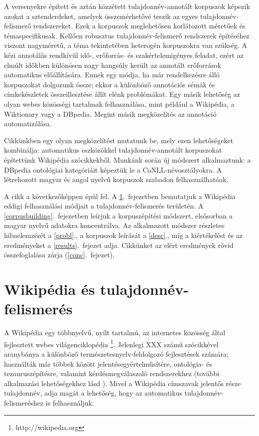 \documentclass{llncs}
\begin{document}
A versenyekre épített és aztán közzétett tulajdonnév-annotált korpuszok képezik azokat a sztenderdeket, amelyek összemérhetővé teszik az egyes tulajdonnév-felismerő rendszereket. Ezek a korpuszok meglehetősen korlátozott méretűek és témaspecifikusak. Kellően robusztus tulajdonnév-felismerő rendszerek építéséhez viszont nagyméretű, a téma tekintetében heterogén korpuszokra van szükség. A kézi annotálás rendkívül idő-, erőforrás- és szakértelemigényes feladat, ezért az elmúlt időkben különösen nagy hangsúly került az annotált erőforrások automatikus előállítására. Ennek egy módja, ha már rendelkezésre álló korpuszokat dolgozunk össze; ekkor a különböző annotációs sémák és címkekészletek összeillesztése állít elénk problémákat. Egy másik lehetőség az olyan webes közösségi tartalmak felhasználása, mint például a Wikipédia, a Wiktionary vagy a DBpedia. Megint másik megközelítés az annotáció automatizálása. 

Cikkünkben egy olyan megközelítést mutatunk be, mely ezen lehetőségeket kombinálja: automatikus eszközökkel tulajdonnév-annotált korpuszokat építettünk Wikipédia szócikkekből. Munkánk során új módszert alkalmaztunk: a DBpedia ontológiai kategóriáit képeztük le a CoNLL-névosztályokra. A létrehozott magyar és angol nyelvű korpuszok szabadon felhasználhatóak. 

A cikk a következőképpen épül fel. A \ref{wiki:ner}.~fejezetben bemutatjuk a Wikipédia eddigi felhasználási módjait a tulajdonnév-felismerés területén. A \ref{corpusbuilding}.~fejezetben leírjuk a korpuszépítési módszert, elsősorban a magyar nyelvű adatokra koncentrálva. Az alkalmazott módszer részletes hibaelemzését a \ref{probl}., a korpuszok leírását a \ref{desc}., míg a kiértékelést és az eredményeket a \ref{results}.~fejezet adja. Cikkünket az elért eredmények rövid összefoglalása zárja (\ref{conc}.~fejezet). 


\section{Wikipédia és tulajdonnév-felismerés}
\label{wiki:ner}

A Wikipédia egy többnyelvű, nyílt tartalmú, az internetes közösség által fejlesztett webes világenciklopédia \footnote{http://wikipedia.org}. Jelenlegi XXX számú szócikkével aranybánya a különböző természetesnyelv-feldolgozó fejlesztések számára; használták már többek között jelentésegyértelműsítére, ontológia- és tezauruszépítésre, valamint kérdésmegválaszoló rendszerekhez (további alkalmazási lehetőségekhez lásd \cite{Medelyan:09}). Mivel a Wikipédia címszavak jelentős része tulajdonnév, adja magát a lehetőség, hogy az automatikus tulajdonnév-felismeréshez is felhasználjuk. 
\end{document}
